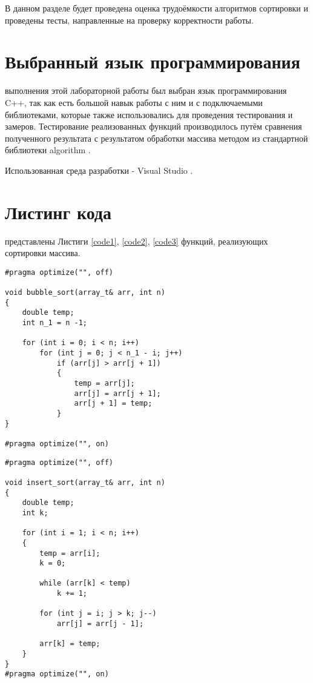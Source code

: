 В данном разделе будет проведена оценка трудоёмкости алгоритмов сортировки и проведены тесты, направленные на проверку корректности работы.

\section{Выбранный язык программирования}
 выполнения этой лабораторной работы был выбран язык программирования C++, так как есть большой навык работы с ним и с подключаемыми библиотеками, которые также использовались для проведения тестирования и замеров. Тестирование реализованных функций производилось путём сравнения полученного результата с результатом обработки массива методом из стандартной библиотеки algorithm \cite{algorithm}.

Использованная среда разработки - Visual Studio \cite{Visual}.

\section{Листинг кода}
 представлены Листиги \ref{code1}, \ref{code2}, \ref{code3} функций, реализующих сортировки массива.
\begin{lstlisting}[label=code1, caption = Сортировка пузырьком]
#pragma optimize("", off)

void bubble_sort(array_t& arr, int n)
{
	double temp;
	int n_1 = n -1;
	
	for (int i = 0; i < n; i++)
		for (int j = 0; j < n_1 - i; j++)
			if (arr[j] > arr[j + 1])
			{
				temp = arr[j];
				arr[j] = arr[j + 1];
				arr[j + 1] = temp;
			}
}

#pragma optimize("", on)
\end{lstlisting}

\begin{lstlisting}[label=code2, caption = Сортировка вставками]
#pragma optimize("", off)

void insert_sort(array_t& arr, int n)
{
	double temp;
	int k;
	
	for (int i = 1; i < n; i++)
	{
		temp = arr[i];
		k = 0;
		
		while (arr[k] < temp)
			k += 1;
		
		for (int j = i; j > k; j--)
			arr[j] = arr[j - 1];
		
		arr[k] = temp;
	}
}
#pragma optimize("", on)
\end{lstlisting}

